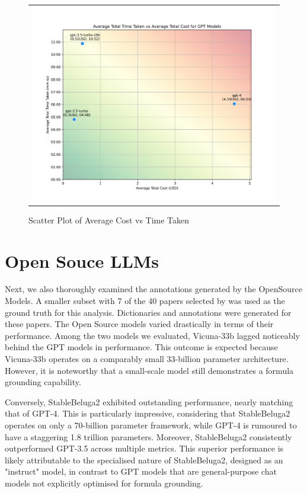 \begin{figure}[htpb]
  \centering
  \begin{tabular}{c}
  \includegraphics[width=14cm]{images/gpt-time-v-cost.png}
  \end{tabular}
  \caption[Cost vs Time]{Scatter Plot of Average Cost vs Time Taken}\label{fig:gpt-time-v-cost}
\end{figure}


\section{Open Souce LLMs}

Next, we also thoroughly examined the annotations generated by the OpenSource Models. A smaller subset with 7 of the 40 papers selected by \citet{asakura2022building} was used as the ground truth for this analysis. Dictionaries and annotations were generated for these papers. The Open Source models varied drastically in terms of their performance. Among the two models we evaluated, Vicuna-33b lagged noticeably behind the GPT models in performance. This outcome is expected because Vicuna-33b operates on a comparably small 33-billion parameter architecture. However, it is noteworthy that a small-scale model still demonstrates a formula grounding capability.

Conversely, StableBeluga2 exhibited outstanding performance, nearly matching that of GPT-4. This is particularly impressive, considering that StableBeluga2 operates on only a 70-billion parameter framework, while GPT-4 is rumoured to have a staggering 1.8 trillion parameters. Moreover, StableBeluga2 consistently outperformed GPT-3.5 across multiple metrics. This superior performance is likely attributable to the specialised nature of StableBeluga2, designed as an "instruct" model, in contrast to GPT models that are general-purpose chat models not explicitly optimised for formula grounding.

